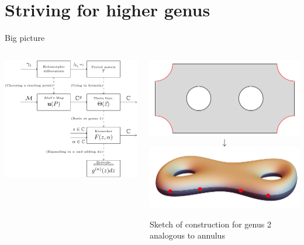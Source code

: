 \documentclass[11pt,aspectratio=169]{beamer}
\begin{document}
\section{Striving for higher genus}

\begin{frame}{Big picture}
    \begin{columns}
        \begin{column}{0.45\textwidth}
            \includegraphics[width=\columnwidth]{assets/diagram.png}
        \end{column}
        \begin{column}{0.55\textwidth}
            \center
            \includegraphics[width=0.7\columnwidth]{assets/FlatGenus2.png}
            \[\downarrow\]
            \includegraphics[width=0.7\columnwidth]{assets/ThreeDGenus2.png}

            \tiny Sketch of construction for genus 2 analogous to annulus
        \end{column}
    \end{columns}
\end{frame}
\end{document}
